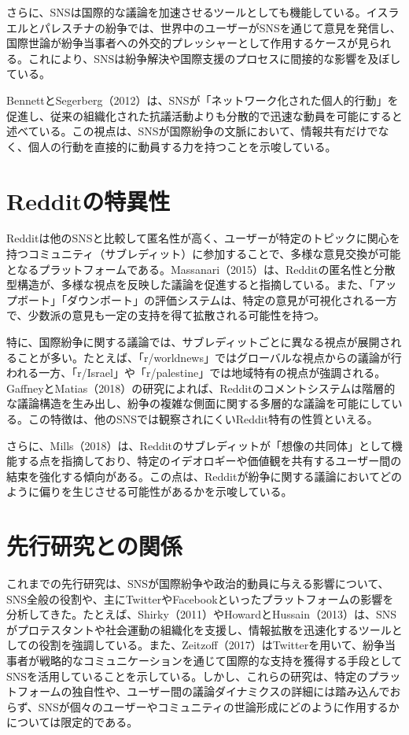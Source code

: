 \documentclass[11pt, a4j]{jreport}
\begin{document}
    さらに、SNSは国際的な議論を加速させるツールとしても機能している。イスラエルとパレスチナの紛争では、世界中のユーザーがSNSを通じて意見を発信し、国際世論が紛争当事者への外交的プレッシャーとして作用するケースが見られる。これにより、SNSは紛争解決や国際支援のプロセスに間接的な影響を及ぼしている。

    BennettとSegerberg（2012）は、SNSが「ネットワーク化された個人的行動」を促進し、従来の組織化された抗議活動よりも分散的で迅速な動員を可能にすると述べている。この視点は、SNSが国際紛争の文脈において、情報共有だけでなく、個人の行動を直接的に動員する力を持つことを示唆している。

    \section{Redditの特異性}
    Redditは他のSNSと比較して匿名性が高く、ユーザーが特定のトピックに関心を持つコミュニティ（サブレディット）に参加することで、多様な意見交換が可能となるプラットフォームである。Massanari（2015）は、Redditの匿名性と分散型構造が、多様な視点を反映した議論を促進すると指摘している。また、「アップボート」「ダウンボート」の評価システムは、特定の意見が可視化される一方で、少数派の意見も一定の支持を得て拡散される可能性を持つ。

    特に、国際紛争に関する議論では、サブレディットごとに異なる視点が展開されることが多い。たとえば、「r/worldnews」ではグローバルな視点からの議論が行われる一方、「r/Israel」や「r/palestine」では地域特有の視点が強調される。GaffneyとMatias（2018）の研究によれば、Redditのコメントシステムは階層的な議論構造を生み出し、紛争の複雑な側面に関する多層的な議論を可能にしている。この特徴は、他のSNSでは観察されにくいReddit特有の性質といえる。

    さらに、Mills（2018）は、Redditのサブレディットが「想像の共同体」として機能する点を指摘しており、特定のイデオロギーや価値観を共有するユーザー間の結束を強化する傾向がある。この点は、Redditが紛争に関する議論においてどのように偏りを生じさせる可能性があるかを示唆している。

    \section{先行研究との関係}
    これまでの先行研究は、SNSが国際紛争や政治的動員に与える影響について、SNS全般の役割や、主にTwitterやFacebookといったプラットフォームの影響を分析してきた。たとえば、Shirky（2011）やHowardとHussain（2013）は、SNSがプロテスタントや社会運動の組織化を支援し、情報拡散を迅速化するツールとしての役割を強調している。また、Zeitzoff（2017）はTwitterを用いて、紛争当事者が戦略的なコミュニケーションを通じて国際的な支持を獲得する手段としてSNSを活用していることを示している。しかし、これらの研究は、特定のプラットフォームの独自性や、ユーザー間の議論ダイナミクスの詳細には踏み込んでおらず、SNSが個々のユーザーやコミュニティの世論形成にどのように作用するかについては限定的である。
\end{document}
